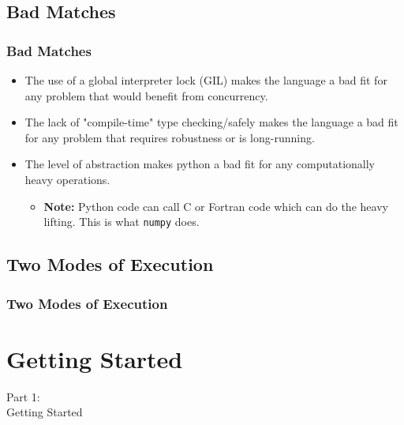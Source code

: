 \subsection{Bad Matches}
\begin{frame}
    \frametitle{Bad Matches}
    \vspace{5mm}
    
    \pause
    \begin{itemize}
      \item The use of a global interpreter lock (GIL) makes the language a bad fit for any problem that would benefit from concurrency.
      \pause
      \item The lack of "compile-time" type checking/safely makes the language a bad fit for any problem that requires robustness or is long-running.
      \pause
      \item The level of abstraction makes python a bad fit for any computationally heavy operations.
      \pause
          \begin{itemize}
              \item \textbf{Note:} Python code can call C or Fortran code which can do the heavy lifting. This is what \texttt{numpy} does.
          \end{itemize}
    \end{itemize}
\end{frame}

\subsection{Two Modes of Execution}
{
\begin{frame}
    \frametitle{Two Modes of Execution}
    \vspace{5mm}
    
\end{frame}
}


\section{Getting Started}
\begin{frame}
    \vspace{25mm}
    \begin{center}
        \Huge{Part 1:\\Getting Started}
    \end{center}
\end{frame}

